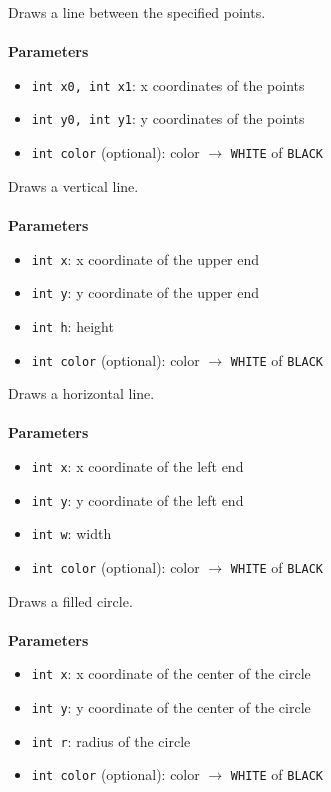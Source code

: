 \documentclass[11pt,fleqn]{book} %
\begin{document}
\newpage

\begin{libf}[drawLine(x0, y0, x1, y1, \emph{color=WHITE})]
	Draws a line between the specified points.\\ \\
	\textbf{Parameters}
	\begin{itemize}
		\item \texttt{int x0, int x1}: x coordinates of the points
		\item \texttt{int y0, int y1}: y coordinates of the points
		\item \texttt{int color} (optional): color $\rightarrow$ \texttt{WHITE} of \texttt{BLACK}
	\end{itemize}
\end{libf}

\begin{libf}[drawFastVLine(x, y, h, \emph{color=WHITE})]
	Draws a vertical line.\\ \\
	\textbf{Parameters}
	\begin{itemize}
		\item \texttt{int x}: x coordinate of the upper end
		\item \texttt{int y}: y coordinate of the upper end
		\item \texttt{int h}: height
		\item \texttt{int color} (optional): color $\rightarrow$ \texttt{WHITE} of \texttt{BLACK}
	\end{itemize}
\end{libf}

\begin{libf}[drawFastHLine(x, y, w, \emph{color=WHITE})]
	Draws a horizontal line.\\ \\
	\textbf{Parameters}
	\begin{itemize}
		\item \texttt{int x}: x coordinate of the left end
		\item \texttt{int y}: y coordinate of the left end
		\item \texttt{int w}: width
		\item \texttt{int color} (optional): color $\rightarrow$ \texttt{WHITE} of \texttt{BLACK}
	\end{itemize}
\end{libf}

\begin{libf}[fillCircle(x, y, r, \emph{color=WHITE})]
	Draws a filled circle.\\ \\
	\textbf{Parameters}
	\begin{itemize}
		\item \texttt{int x}: x coordinate of the center of the circle
		\item \texttt{int y}: y coordinate of the center of the circle
		\item \texttt{int r}: radius of the circle
		\item \texttt{int color} (optional): color $\rightarrow$ \texttt{WHITE} of \texttt{BLACK}
	\end{itemize}
\end{libf}
\end{document}
